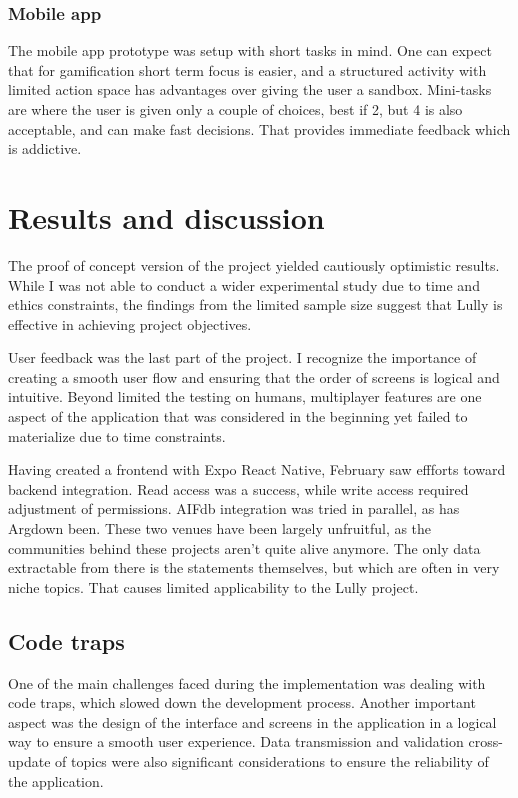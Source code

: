 \documentclass{report}
\begin{document}
\subsection{Mobile app}
The mobile app prototype was setup with short tasks in mind. One can expect that for gamification short term focus is easier, and a structured activity with limited action space has advantages over giving the user a sandbox. Mini-tasks are where the user is given only a couple of choices, best if 2, but 4 is also acceptable, and can make fast decisions. That provides immediate feedback which is addictive. 

\chapter{Results and discussion}

The proof of concept version of the  project yielded cautiously optimistic results. While I was not able to conduct a wider experimental study due to time and ethics constraints, the findings from the limited sample size suggest that Lully is effective in achieving project objectives. 

User feedback was the last part of the project. I recognize the importance of creating a smooth user flow and ensuring that the order of screens is logical and intuitive. Beyond limited the testing on humans, multiplayer features are one aspect of the application that was considered in the beginning yet failed to materialize due to time constraints. 

Having created a frontend with Expo React Native, February saw effforts toward backend integration. Read access was a success, while write access required adjustment of permissions. AIFdb integration was tried in parallel, as has Argdown been. These two venues have been largely unfruitful, as the communities behind these projects aren't quite alive anymore. The only data extractable from there is the statements themselves, but which are often in very niche topics. That causes limited applicability to the Lully project. 

\section{Code traps}
One of the main challenges faced during the implementation was dealing with code traps, which slowed down the development process. Another important aspect was the design of the interface and screens in the application in a logical way to ensure a smooth user experience. Data transmission and validation cross-update of topics were also significant considerations to ensure the reliability of the application.
\end{document}

